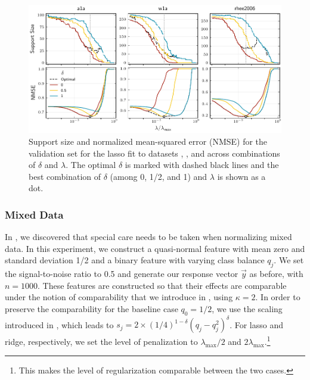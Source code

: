 \begin{figure}[htpb]
  \centering
  \includegraphics[]{plots/hyperopt_paths.pdf}
  \caption{%
    Support size and normalized mean-squared error (NMSE) for the validation set for the lasso
    fit to datasets , , and  across combinations of
    \(\delta\) and \(\lambda\). The optimal \(\delta\) is marked with dashed black lines and
    the best combination of \(\delta\) (among 0, 1/2, and 1) and \(\lambda\) is shown as a dot. \label{fig:hyperopt-support}
  }
\end{figure}


\subsubsection{Mixed Data}\label{sec:experiments-mixed-data}

In , we discovered that special care needs to be taken when
normalizing mixed data. In this experiment, we construct a quasi-normal feature with mean
zero and standard deviation 1/2 and a binary feature with varying class balance \(q_j\). We
set the signal-to-noise ratio to 0.5 and generate our response vector \(\vec{y}\) as
before, with \(n = \num{1000}\). These features are constructed so that their effects are
comparable under the notion of comparability that we introduce in ,
using \(\kappa = 2\). In order to preserve the comparability for the baseline case \(q_0 =
1/2\), we use the scaling introduced in , which leads to \(s_j = 2
\times (1/4)^{1-\delta}(q_j-q_j^2)^\delta\). For lasso and ridge, respectively, we set the
level of penalization to \(\lambda_\text{max}/2\) and
\(2\lambda_\text{max}\).\footnote{This makes the level of regularization comparable between
  the two cases.}

